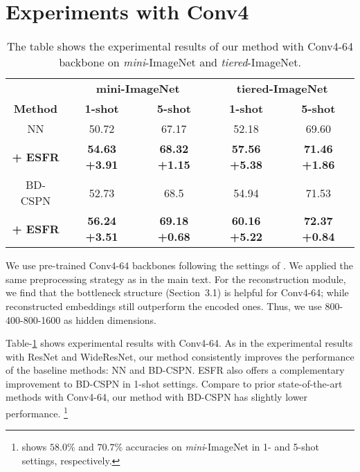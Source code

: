 \documentclass{article}
\begin{document}
\section{Experiments with Conv4}
\begin{table}[h]
\label{table:conv4}
	\begin{small}
		\caption{The table shows the experimental results of our method with Conv4-64 backbone on \textit{mini}-ImageNet and \textit{tiered}-ImageNet.}
		\begin{center}
			\begin{tabular}{ccccc}
				\hline
				\textbf{} & \multicolumn{2}{c}{\textbf{mini-ImageNet}} & \multicolumn{2}{c}{\textbf{tiered-ImageNet}} \\
				\textbf{Method} & \textbf{1-shot} & \textbf{5-shot} & \textbf{1-shot} & \textbf{5-shot} \\ \hline
				NN & 50.72 & 67.17 & 52.18 & 69.60 \\
				\rowcolor[HTML]{EFEFEF} 
				\textbf{+ ESFR} & \textbf{54.63 {\scriptsize+3.91}} & \textbf{68.32 {\scriptsize+1.15}} & \textbf{57.56 {\scriptsize+5.38}} & \textbf{71.46 {\scriptsize+1.86}} \\ \hline
				BD-CSPN & 52.73 & 68.5 & 54.94 & 71.53 \\
				\rowcolor[HTML]{EFEFEF} 
				\textbf{+ ESFR} & \textbf{56.24 {\scriptsize+3.51}} & \textbf{69.18 {\scriptsize+0.68}} & \textbf{60.16 {\scriptsize+5.22}} & \textbf{72.37 {\scriptsize+0.84}} \\ \hline
			\end{tabular}
		\end{center}
	\end{small}
\end{table}
We use pre-trained Conv4-64 backbones following the settings of \citet{SimpleShot}.
We applied the same preprocessing strategy as in the main text.
For the reconstruction module, we find that the bottleneck structure (Section~3.1) is helpful for Conv4-64; while reconstructed embeddings still outperform the encoded ones.
Thus, we use 800-400-800-1600 as hidden dimensions.

Table-\ref{table:conv4} shows experimental results with Conv4-64.
As in the experimental results with ResNet and WideResNet, our method consistently improves the performance of the baseline methods: NN and BD-CSPN.
ESFR also offers a complementary improvement to BD-CSPN \cite{BDCSPN} in 1-shot settings.
Compare to prior state-of-the-art methods with Conv4-64, our method with BD-CSPN has slightly lower performance.
\footnote{\citet{SIB} shows $58.0\%$ and $70.7\%$ accuracies on {\it mini}-ImageNet in 1- and 5-shot settings, respectively.} \end{document}
\end{document}
